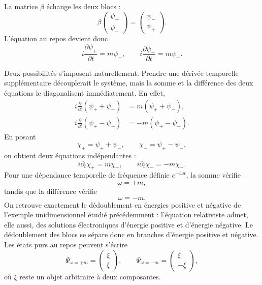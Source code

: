 La matrice \(\beta\) échange les deux blocs :
\begin{equation}
\beta
\begin{pmatrix}
\psi_+\\
\psi_-
\end{pmatrix}
=
\begin{pmatrix}
\psi_-\\
\psi_+
\end{pmatrix}.
\end{equation}
L’équation au repos devient donc
\begin{equation}
i\frac{\partial\psi_+}{\partial t}=m\psi_-,
\qquad
i\frac{\partial\psi_-}{\partial t}=m\psi_+.
\end{equation}

Deux possibilités s’imposent naturellement. Prendre une dérivée temporelle supplémentaire découplerait le système, mais la somme et la différence des deux équations le diagonalisent immédiatement. En effet,
\begin{align}
i\frac{\partial}{\partial t}(\psi_++\psi_-)
&=m(\psi_++\psi_-),\\
i\frac{\partial}{\partial t}(\psi_+-\psi_-)
&=-m(\psi_+-\psi_-).
\end{align}
En posant
\begin{equation}
\chi_+=\psi_++\psi_-,
\qquad
\chi_-=\psi_+-\psi_-,
\end{equation}
on obtient deux équations indépendantes :
\begin{equation}
i\partial_t\chi_+=m\chi_+,
\qquad
i\partial_t\chi_-=-m\chi_-.
\end{equation}
Pour une dépendance temporelle de fréquence définie \(e^{-i\omega t}\), la somme vérifie
\begin{equation}
\omega=+m,
\end{equation}
tandis que la différence vérifie
\begin{equation}
\omega=-m.
\end{equation}
On retrouve exactement le dédoublement en énergies positive et négative de l’exemple unidimensionnel étudié précédemment : l’équation relativiste admet, elle aussi, des solutions électroniques d’énergie positive et d’énergie négative. Le dédoublement des blocs se sépare donc en branches d’énergie positive et négative. Les états purs au repos peuvent s’écrire
\begin{equation}
\Psi_{\omega=+m}=
\begin{pmatrix}
\xi\\
\xi
\end{pmatrix},
\qquad
\Psi_{\omega=-m}=
\begin{pmatrix}
\xi\\
-\xi
\end{pmatrix},
\end{equation}
où \(\xi\) reste un objet arbitraire à deux composantes.

